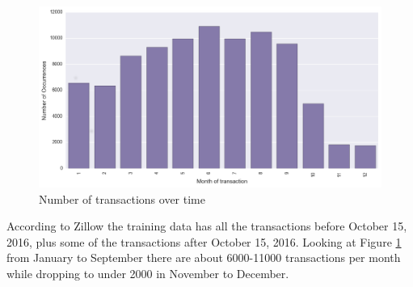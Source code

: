 \documentclass[a4paper]{article}
\begin{document}
\begin{figure}
\centering
\includegraphics[width=1\textwidth]{./img/train-transactiondate.png}
\caption{\label{fig:transactions}Number of transactions over time}
\end{figure}
According to Zillow \cite{zillowprize} the training data has all the transactions before October 15, 2016, plus some of the transactions after October 15, 2016. Looking at Figure \ref{fig:transactions} from January to September there are about 6000-11000 transactions per month while dropping to under 2000 in November to December.
\end{document}
